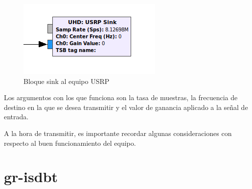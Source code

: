 \begin{figure}[h!]
	\centering
	\includegraphics[scale=0.55]{figuras/cap04/sink_block}
	\caption{\label{f:sink_block} Bloque sink al equipo USRP}
\end{figure}

Los argumentos con los que funciona son la tasa de muestras, la frecuencia de destino en la que se desea transmitir y el valor de ganancia aplicado a la señal de entrada. 

A la hora de transmitir, es importante recordar algunas consideraciones con respecto al buen funcionamiento del equipo.

\section{gr-isdbt}